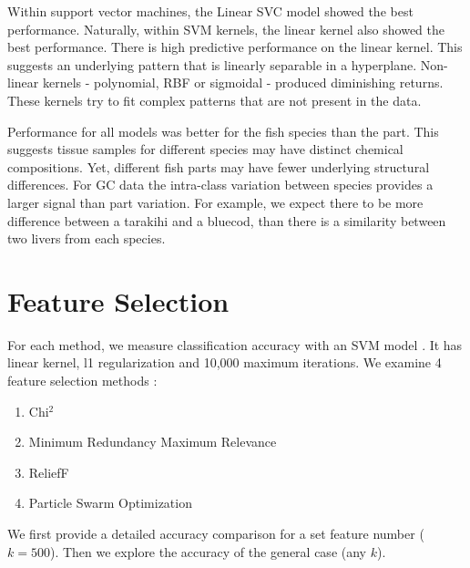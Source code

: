 \documentclass[runningheads]{llncs}
\begin{document}
Within support vector machines, the Linear SVC model showed the best performance.
Naturally, within SVM kernels, the linear kernel also showed the best performance.
There is high predictive performance on the linear kernel.
This suggests an underlying pattern that is linearly separable in a hyperplane.
Non-linear kernels - polynomial, RBF or sigmoidal - produced diminishing returns.
These kernels try to fit complex patterns that are not present in the data.

Performance for all models was better for the fish species than the part.
This suggests tissue samples for different species may have distinct chemical compositions.
Yet, different fish parts may have fewer underlying structural differences.
For GC data the intra-class variation between species provides a larger signal than part variation.
For example, we expect there to be more difference between a tarakihi and a bluecod, than there is a similarity between two livers from each species.

\section{Feature Selection}


For each method, we measure classification accuracy with an SVM model \cite{sklearn2021feature}.
It has linear kernel, l1 regularization \cite{robnik2003theoretical} and 10,000 maximum iterations.
We examine 4 feature selection methods \cite{chappers2015skfeature}:

\begin{enumerate}
  \item Chi$^2$ \cite{liu1995chi2}
  \item Minimum Redundancy Maximum Relevance \cite{ding2005minimum}
  \item ReliefF \cite{robnik2003theoretical}
  \item Particle Swarm Optimization \cite{kennedy1995particle,kennedy1997discrete}
\end{enumerate}

We first provide a detailed accuracy comparison for a set feature number ($k = 500$).
Then we explore the accuracy of the general case (any $k$).
\end{document}
